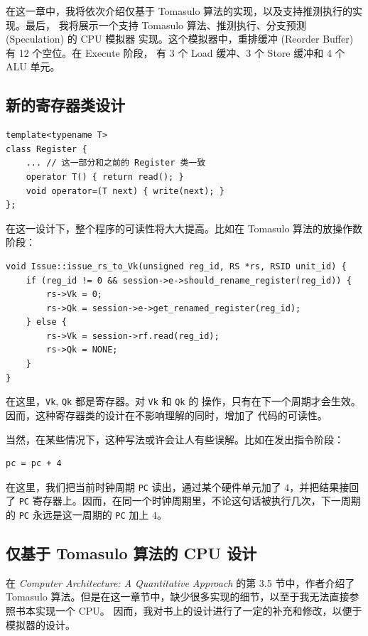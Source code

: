 \documentclass[12pt]{article}
\begin{document}
    在这一章中，我将依次介绍仅基于 Tomasulo 算法的实现，以及支持推测执行的实现。最后，
    我将展示一个支持 Tomasulo 算法、推测执行、分支预测 (Speculation) 的 CPU 模拟器
    实现。这个模拟器中，重排缓冲 (Reorder Buffer) 有 12 个空位。在 Execute 阶段，
    有 3 个 Load 缓冲、3 个 Store 缓冲和 4 个 ALU 单元。

    \subsection{新的寄存器类设计}\label{new_register_design}

    \begin{verbatim}
template<typename T>
class Register {
    ... // 这一部分和之前的 Register 类一致
    operator T() { return read(); }
    void operator=(T next) { write(next); }
};
    \end{verbatim}

    在这一设计下，整个程序的可读性将大大提高。比如在 Tomasulo 算法的放操作数阶段：

    \begin{verbatim}
void Issue::issue_rs_to_Vk(unsigned reg_id, RS *rs, RSID unit_id) {
    if (reg_id != 0 && session->e->should_rename_register(reg_id)) {
        rs->Vk = 0;
        rs->Qk = session->e->get_renamed_register(reg_id);
    } else {
        rs->Vk = session->rf.read(reg_id);
        rs->Qk = NONE;
    }
}
    \end{verbatim}

    在这里，\texttt{Vk}, \texttt{Qk} 都是寄存器。对 \texttt{Vk} 和 \texttt{Qk} 的
    操作，只有在下一个周期才会生效。因而，这种寄存器类的设计在不影响理解的同时，增加了
    代码的可读性。

    当然，在某些情况下，这种写法或许会让人有些误解。比如在发出指令阶段：

    \begin{verbatim}
pc = pc + 4
    \end{verbatim}

    在这里，我们把当前时钟周期 \texttt{PC} 读出，通过某个硬件单元加了 $4$，并把结果接回了
    \texttt{PC} 寄存器上。因而，在同一个时钟周期里，不论这句话被执行几次，下一周期的 \texttt{PC}
    永远是这一周期的 \texttt{PC} 加上 $4$。

    \subsection{仅基于 Tomasulo 算法的 CPU 设计}

    在 \emph{Computer Architecture: A Quantitative Approach} 的第 3.5 节中，作者介绍了
    Tomasulo 算法。但是在这一章节中，缺少很多实现的细节，以至于我无法直接参照书本实现一个 CPU。
    因而，我对书上的设计进行了一定的补充和修改，以便于模拟器的设计。
\end{document}
